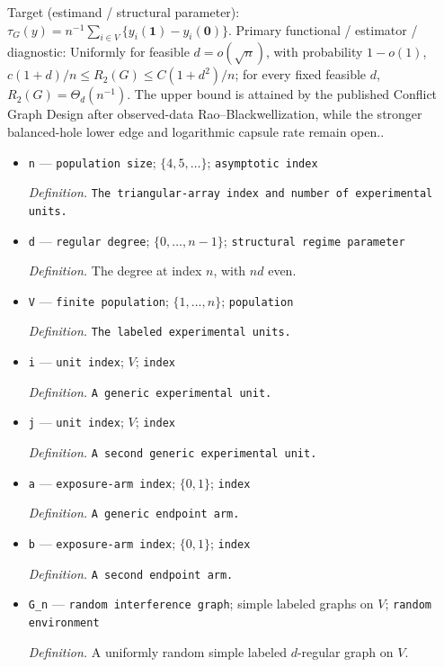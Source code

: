 \documentclass{article}
\begin{document}
Target (estimand / structural parameter): \(\tau_G(y)=n^{-1}\sum_{i\in V}\{y_i(\boldsymbol 1)-y_i(\boldsymbol 0)\}\).
Primary functional / estimator / diagnostic: Uniformly for feasible \(d=o(\sqrt n)\), with probability \(1-o(1)\), \(c(1+d)/n\le R_2(G)\le C(1+d^2)/n\); for every fixed feasible \(d\), \(R_2(G)=\Theta_d(n^{-1})\). The upper bound is attained by the published Conflict Graph Design after observed-data Rao--Blackwellization, while the stronger balanced-hole lower edge and logarithmic capsule rate remain open..
\begin{itemize}
  \item \texttt{n} --- \texttt{population size}; \(\{4,5,\ldots\}\); \texttt{asymptotic index}
  \par\smallskip\noindent\emph{Definition.} \texttt{The triangular-\allowbreak{}array index and number of experimental units.}
  \item \texttt{d} --- \texttt{regular degree}; \(\{0,\ldots,n-1\}\); \texttt{structural regime parameter}
  \par\smallskip\noindent\emph{Definition.} The degree at index \(n\), with \(nd\) even.
  \item \texttt{V} --- \texttt{finite population}; \(\{1,\ldots,n\}\); \texttt{population}
  \par\smallskip\noindent\emph{Definition.} \texttt{The labeled experimental units.}
  \item \texttt{i} --- \texttt{unit index}; \(V\); \texttt{index}
  \par\smallskip\noindent\emph{Definition.} \texttt{A generic experimental unit.}
  \item \texttt{j} --- \texttt{unit index}; \(V\); \texttt{index}
  \par\smallskip\noindent\emph{Definition.} \texttt{A second generic experimental unit.}
  \item \texttt{a} --- \texttt{exposure-\allowbreak{}arm index}; \(\{0,1\}\); \texttt{index}
  \par\smallskip\noindent\emph{Definition.} \texttt{A generic endpoint arm.}
  \item \texttt{b} --- \texttt{exposure-\allowbreak{}arm index}; \(\{0,1\}\); \texttt{index}
  \par\smallskip\noindent\emph{Definition.} \texttt{A second endpoint arm.}
  \item \texttt{G\_\allowbreak{}n} --- \texttt{random interference graph}; simple labeled graphs on \(V\); \texttt{random environment}
  \par\smallskip\noindent\emph{Definition.} A uniformly random simple labeled \(d\)-regular graph on \(V\).

\end{itemize}
\end{document}
